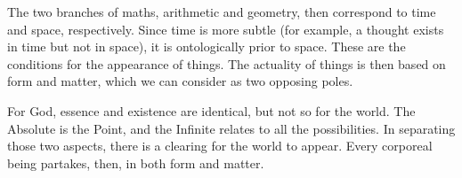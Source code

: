 The two branches of maths, arithmetic and geometry, then correspond to time and space, respectively. Since time is more subtle (for example, a thought exists in time but not in space), it is ontologically prior to space. These are the conditions for the appearance of things. The actuality of things is then based on form and matter, which we can consider as two opposing poles.

For God, essence and existence are identical, but not so for the world. The Absolute is the Point, and the Infinite relates to all the possibilities. In separating those two aspects, there is a clearing for the world to appear. Every corporeal being partakes, then, in both form and matter.




